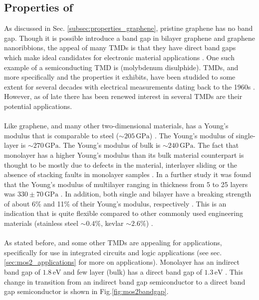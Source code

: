 \documentclass[%
 reprint,
 amsmath,amssymb,
 aps,
pra,
floatfix,
]{revtex4-1}
\begin{document}
\subsection{\label{subsec:mos2_properties} Properties of }
As discussed in Sec. \ref{subsec:properties_graphene}, pristine graphene has no band gap. Though it is possible introduce a band gap in bilayer graphene and graphene nanoribbions, the appeal of many TMDs is that they have direct band gaps which make ideal candidates for electronic material applications \cite{grapheneLike2Dreview2013}. One such example of a semiconducting TMD is  (molybdenum disulphide). TMDs, and more specifically  and the properties it exhibits, have been studided to some extent for several decades with electrical measurements dating back to the 1960s \cite{Frindt1963, Fivaz1967}. However, as of late there has been renewed interest in several TMDs are their potential applications. 
\\ \\
Like graphene, and many other two-dimensional materials,  has a Young's modulus that is comparable to steel ($\sim 205 \mathrm{\,GPa}$) \cite{Warlimont2009}. The Young's modulus of single-layer  is $\sim 270 \mathrm{\,GPa}$. The Young's modulus of bulk  is $\sim 240 \mathrm{\,GPa}$. The fact that monolayer  has a higher Young's modulus than its bulk material counterpart is thought to be mostly due to defects in the material, interlayer sliding or the absence of stacking faults in monolayer samples \cite{Lembke2015}. In a further study it was found that the Young's modulus of multilayer  ranging in thickness from 5 to 25 layers was $330 \pm 70 \mathrm{\,GPa}$ \cite{Castellanos2012}. In addition, both single and bilayer  have a breaking strength of about 6\% and 11\% of their Young's modulus, respectively \cite{Bertolazzi2011}. This is an indication that  is quite flexible compared to other commonly used engineering materials (stainless steel $\sim 0.4\%$, kevlar $\sim 2.6\%$) \cite{Gere1997}. 
\\ \\
As stated before,  and some other TMDs are appealing for applications, specifically for use in integrated circuits and logic applications (see sec.\ref{sec:mos2_applications} for more on applications). Monolayer  has an indirect band gap of $1.8 \mathrm{\,eV}$ and few layer (bulk)  has a direct band gap of $1.3 \mathrm{\,eV}$ \cite{grapheneLike2Dreview2013, Kam1982, Mak2010, Gourmelon1997, Fortin1982}. This change in transition from an indirect band gap semiconductor to a direct band gap semiconductor is shown in Fig.\ref{fig:mos2bandgap}.
\end{document}

